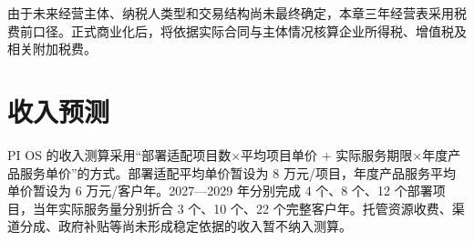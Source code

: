 由于未来经营主体、纳税人类型和交易结构尚未最终确定，本章三年经营表采用税费前口径。正式商业化后，将依据实际合同与主体情况核算企业所得税、增值税及相关附加税费。

\par{}
\section{收入预测}\label{sec:6.2}
PI OS 的收入测算采用“部署适配项目数\ensuremath{\times}平均项目单价 + 实际服务期限\ensuremath{\times}年度产品服务单价”的方式。部署适配平均单价暂设为 8 万元/\allowbreak{}项目，年度产品服务平均单价暂设为 6 万元/\allowbreak{}客户年。2027---2029 年分别完成 4 个、8 个、12 个部署项目，当年实际服务量分别折合 3 个、10 个、22 个完整客户年。托管资源收费、渠道分成、政府补贴等尚未形成稳定依据的收入暂不纳入测算。

